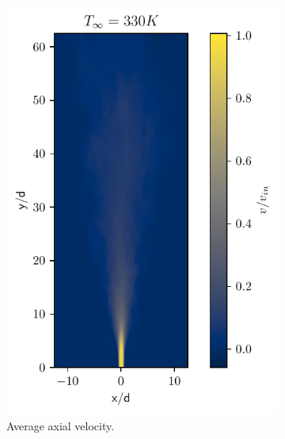 \begin{figure}[htbp!]
\begin{subfigure}{0.25\textwidth}
	\includegraphics[scale=.65]{figures/Plots/vertical/330/v_scaled_vert_avg_330.pdf}
	\caption{Average axial velocity.} \label{330_v_3}
\end{subfigure}
\hfill
\begin{subfigure}{0.25\textwidth}
	\centering

\end{subfigure}
\end{figure}
